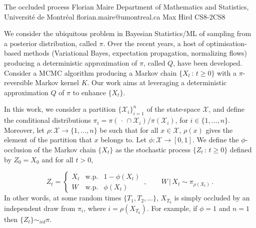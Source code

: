 \begin{talk}
  {The occluded process}%
  {Florian Maire}%
  {Department of Mathematics and Statistics, Universit\'e de Montr\'eal}%
  {florian.maire@umontreal.ca}%
  {Max Hird}%
{}{}{CS8-2}{CS8}


				
				

We consider the ubiquitous problem in Bayesian Statistics/ML of sampling from a posterior distribution, called $\pi$. Over the recent years, a host of optimisation-based methods (Variational Bayes, expectation propagation, normalizing flows) producing a deterministic approximation of $\pi$, called $Q$, have been developed.  Consider a MCMC algorithm producing a Markov chain $\{X_t\,:\,t\geq 0\}$ with a $\pi$-reversible Markov kernel $K$. Our work aims at leveraging a deterministic approximation $Q$ of $\pi$  to enhance $\{X_t\}$.


In this work, we consider a partition $\{\mathcal{X}_i\}_{i=1}^n$ of the state-space $\mathcal{X}$, and define the conditional distributions $\pi_i=\pi(\,\cdot\,\cap \mathcal{X}_i)/\pi(\mathcal{X}_i)$, for $i\in\{1,\ldots,n\}$. Moreover, let  $\rho:\mathcal{X}\to\{1,\ldots,n\}$ be such that for all $x\in\mathcal{X}$, $\rho(x)$ gives the element of the partition that $x$ belongs to. Let $\phi:\mathcal{X}\to[0,1]$. We define the $\phi$-occlusion of the Markov chain $\{X_t\}$ as the stochastic process $\{Z_t\,:\,t\geq 0\}$ defined by $Z_0=X_0$ and for all $t>0$,

\begin{equation}
Z_t=\left\{
\begin{array}{ccc}
X_t&\text{w.p.}&1-\phi(X_t)\\
W&\text{w.p.}&\phi(X_t)
\end{array}\,,
\right.\qquad 
W\,|\,X_t\sim \pi_{\rho(X_t)}\,.
\end{equation}
In other words, at some random times $\{T_1,T_2,\ldots\}$, $X_{T_k}$ is simply occluded by an independent draw from $\pi_{i}$, where $i=\rho(X_{T_k})$. For example, if $\phi=1$ and $n=1$ then $\{Z_t\}\sim_{iid}\pi$. 


\end{talk}
